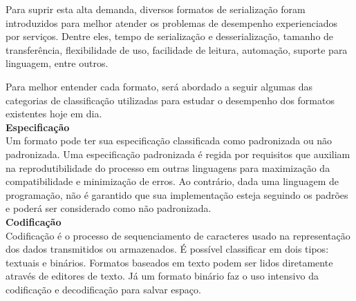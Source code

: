 Para suprir esta alta demanda, diversos formatos de serialização foram introduzidos para melhor atender os problemas de desempenho experienciados por serviços. Dentre eles, tempo de serialização e desserialização, tamanho de transferência, flexibilidade de uso, facilidade de leitura, automação, suporte para linguagem, entre outros. \cite{Guller2016}

\begin{table}[ht!]
  \centering
  \caption{Comparação de formatos de serialização}
\end{table}

Para melhor entender cada formato, será abordado a seguir algumas das categorias de classificação utilizadas para estudar o desempenho dos formatos existentes hoje em dia. \\

\textbf{Especificação} \\

Um formato pode ter sua especificação classificada como padronizada ou não padronizada. Uma especificação padronizada é regida por requisitos que auxiliam na reprodutibilidade do processo em outras linguagens para maximização da compatibilidade e minimização de erros. Ao contrário, dada uma linguagem de programação, não é garantido que sua implementação esteja seguindo os padrões e poderá ser considerado como não padronizada. \cite{McDermid1991} \\

\textbf{Codificação} \\

Codificação é o processo de sequenciamento de caracteres usado na representação dos dados transmitidos ou armazenados. É possível classificar em dois tipos: textuais e binários. Formatos baseados em texto podem ser lidos diretamente através de editores de texto. Já um formato binário faz o uso intensivo da codificação e decodificação para salvar espaço. \cite{Queiros2014} \\

